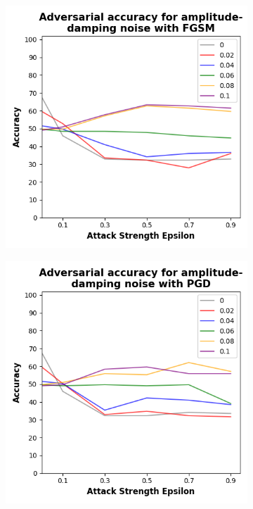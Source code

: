 \begin{figure}[!h]
  \centering

  \begin{subfigure}{0.45\textwidth}
      \includegraphics[width=\linewidth]{figures/evaluation_results/diabetes/pqc/figures/amplitude-damping-fgsm.png}
      \label{fig:diabetes5}
  \end{subfigure} \qquad
  \begin{subfigure}{0.45\textwidth}
      \includegraphics[width=\linewidth]{figures/evaluation_results/diabetes/pqc/figures/amplitude-damping-pgd.png}

\end{subfigure}
\end{figure}
